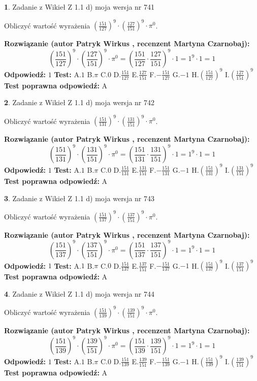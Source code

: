 \documentclass[12pt, a4paper]{article}
\theoremstyle{definition} %
\newtheorem{zad}{}
\newcommand{\zadStart}[1]{\begin{zad}#1\newline}
\newcommand{\zadStop}{\end{zad}}
\newcommand{\rozwStart}[2]{\noindent \textbf{Rozwiązanie (autor #1 , recenzent #2): }\newline}
\newcommand{\rozwStop}{\newline}
\newcommand{\odpStart}{\noindent \textbf{Odpowiedź:}\newline}
\newcommand{\odpStop}{\newline}
\newcommand{\testStart}{\noindent \textbf{Test:}\newline}
\newcommand{\testStop}{\newline}
\newcommand{\kluczStart}{\noindent \textbf{Test poprawna odpowiedź:}\newline}
\newcommand{\kluczStop}{\newline}
\begin{document}
\zadStart{Zadanie z Wikieł Z 1.1 d) moja wersja nr 741}

Obliczyć wartość wyrażenia $(\frac{151}{127})^{9} \cdot (\frac{127}{151})^{9} \cdot \pi^{0}$.
\zadStop
\rozwStart{Patryk Wirkus}{Martyna Czarnobaj}
$$(\frac{151}{127})^{9} \cdot (\frac{127}{151})^{9} \cdot \pi^{0} = (\frac{151}{127} \cdot \frac{127}{151})^{9} \cdot 1 = 1^{9} \cdot 1 = 1$$
\rozwStop
\odpStart
$1$
\odpStop
\testStart
A.$1$ B.$\pi$ C.$0$ D.$\frac{151}{127}$ E.$\frac{127}{151}$
F.$-\frac{151}{127}$ G.$-1$
H.$(\frac{151}{127})^{9}$
I.$(\frac{127}{151})^{9}$
\testStop
\kluczStart
A
\kluczStop



\zadStart{Zadanie z Wikieł Z 1.1 d) moja wersja nr 742}

Obliczyć wartość wyrażenia $(\frac{151}{131})^{9} \cdot (\frac{131}{151})^{9} \cdot \pi^{0}$.
\zadStop
\rozwStart{Patryk Wirkus}{Martyna Czarnobaj}
$$(\frac{151}{131})^{9} \cdot (\frac{131}{151})^{9} \cdot \pi^{0} = (\frac{151}{131} \cdot \frac{131}{151})^{9} \cdot 1 = 1^{9} \cdot 1 = 1$$
\rozwStop
\odpStart
$1$
\odpStop
\testStart
A.$1$ B.$\pi$ C.$0$ D.$\frac{151}{131}$ E.$\frac{131}{151}$
F.$-\frac{151}{131}$ G.$-1$
H.$(\frac{151}{131})^{9}$
I.$(\frac{131}{151})^{9}$
\testStop
\kluczStart
A
\kluczStop



\zadStart{Zadanie z Wikieł Z 1.1 d) moja wersja nr 743}

Obliczyć wartość wyrażenia $(\frac{151}{137})^{9} \cdot (\frac{137}{151})^{9} \cdot \pi^{0}$.
\zadStop
\rozwStart{Patryk Wirkus}{Martyna Czarnobaj}
$$(\frac{151}{137})^{9} \cdot (\frac{137}{151})^{9} \cdot \pi^{0} = (\frac{151}{137} \cdot \frac{137}{151})^{9} \cdot 1 = 1^{9} \cdot 1 = 1$$
\rozwStop
\odpStart
$1$
\odpStop
\testStart
A.$1$ B.$\pi$ C.$0$ D.$\frac{151}{137}$ E.$\frac{137}{151}$
F.$-\frac{151}{137}$ G.$-1$
H.$(\frac{151}{137})^{9}$
I.$(\frac{137}{151})^{9}$
\testStop
\kluczStart
A
\kluczStop



\zadStart{Zadanie z Wikieł Z 1.1 d) moja wersja nr 744}

Obliczyć wartość wyrażenia $(\frac{151}{139})^{9} \cdot (\frac{139}{151})^{9} \cdot \pi^{0}$.
\zadStop
\rozwStart{Patryk Wirkus}{Martyna Czarnobaj}
$$(\frac{151}{139})^{9} \cdot (\frac{139}{151})^{9} \cdot \pi^{0} = (\frac{151}{139} \cdot \frac{139}{151})^{9} \cdot 1 = 1^{9} \cdot 1 = 1$$
\rozwStop
\odpStart
$1$
\odpStop
\testStart
A.$1$ B.$\pi$ C.$0$ D.$\frac{151}{139}$ E.$\frac{139}{151}$
F.$-\frac{151}{139}$ G.$-1$
H.$(\frac{151}{139})^{9}$
I.$(\frac{139}{151})^{9}$
\testStop
\kluczStart
A
\kluczStop
\end{document}
